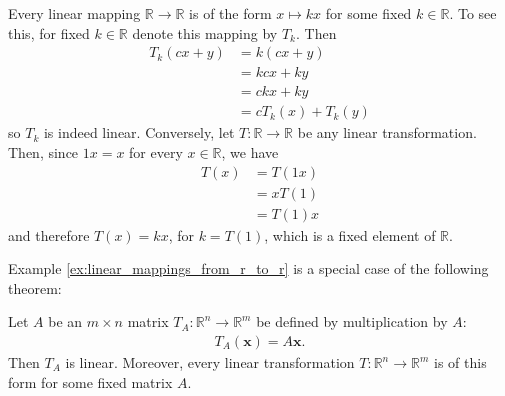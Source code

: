 \documentclass[12pt,letterpaper,reqno]{article}
\numberwithin{equation}{section}
\begin{document}
\begin{example}\label{ex:linear_mappings_from_r_to_r}
Every linear mapping $\mathbb{R}\to \mathbb{R}$ is of the form $x \mapsto kx$ for some fixed $k \in \mathbb{R}$. To see this, for fixed $k \in \mathbb{R}$ denote this mapping by $T_k$. Then
\begin{align*}
	T_k(cx+y)&=k(cx+y) \\
	&=kcx+ky \\
	&=ckx+ky \\
	&=cT_k(x)+T_k(y)
\end{align*}
so $T_k$ is indeed linear. Conversely, let $T:\mathbb{R} \to \mathbb{R}$ be any linear transformation. Then, since $1x=x$ for every $x \in \mathbb{R}$, we have
\begin{align*}
	T(x)&=T(1x) \\
	&=xT(1) \\
	&=T(1)x
\end{align*}
and therefore $T(x)=kx$, for $k=T(1)$, which is a fixed element of $\mathbb{R}$.
\end{example}


Example \ref{ex:linear_mappings_from_r_to_r} is a special case of the following theorem:

\begin{thm}\label{thm:matrix_of_a_linear_mapping}
Let $A$ be an $m \times n$ matrix $T_A:\mathbb{R}^n \to \mathbb{R}^m$ be defined by multiplication by $A$:
\begin{align*}
	T_A(\mathbf{x})=A\mathbf{x}.
\end{align*}	
Then $T_A$ is linear. Moreover, every linear transformation $T:\mathbb{R}^n \to \mathbb{R}^m$ is of this form for some fixed matrix $A$.
\end{thm}
\end{document}
